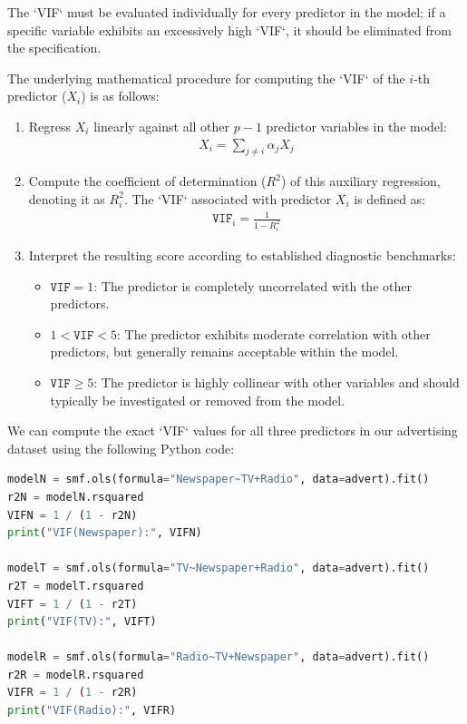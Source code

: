 The `VIF` must be evaluated individually for every predictor in the model; if a specific variable exhibits an excessively high `VIF`, it should be eliminated from the specification.

The underlying mathematical procedure for computing the `VIF` of the $i$-th predictor ($X_i$) is as follows:
\begin{enumerate}
	\item Regress $X_i$ linearly against all other $p-1$ predictor variables in the model:
	\begin{align}
		X_i = \sum_{j \neq i} \alpha_j X_j
	\end{align}
	\item Compute the coefficient of determination ($R^2$) of this auxiliary regression, denoting it as $R_i^2$. The `VIF` associated with predictor $X_i$ is defined as:
	\begin{align}
		\texttt{VIF}_i = \frac{1}{1 - R_i^2}
	\end{align}
	\item Interpret the resulting score according to established diagnostic benchmarks:
	\begin{itemize}
		\item $\texttt{VIF} = 1$: The predictor is completely uncorrelated with the other predictors.
		\item $1 < \texttt{VIF} < 5$: The predictor exhibits moderate correlation with other predictors, but generally remains acceptable within the model.
		\item $\texttt{VIF} \ge 5$: The predictor is highly collinear with other variables and should typically be investigated or removed from the model.
	\end{itemize}
\end{enumerate}

We can compute the exact `VIF` values for all three predictors in our advertising dataset using the following Python code:

\begin{lstlisting}[language=Python]
modelN = smf.ols(formula="Newspaper~TV+Radio", data=advert).fit()
r2N = modelN.rsquared
VIFN = 1 / (1 - r2N)
print("VIF(Newspaper):", VIFN)

modelT = smf.ols(formula="TV~Newspaper+Radio", data=advert).fit()
r2T = modelT.rsquared
VIFT = 1 / (1 - r2T)
print("VIF(TV):", VIFT)

modelR = smf.ols(formula="Radio~TV+Newspaper", data=advert).fit()
r2R = modelR.rsquared
VIFR = 1 / (1 - r2R)
print("VIF(Radio):", VIFR)
\end{lstlisting}

